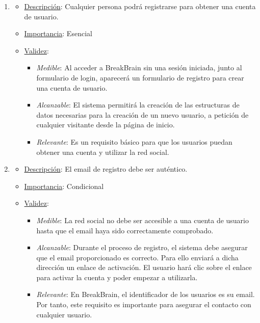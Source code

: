 \begin{enumerate}
\item %
  \begin{itemize}
  \item \underline{Descripción}: Cualquier persona podrá registrarse para obtener una cuenta de usuario.
  \item \underline{Importancia}: Esencial
  \item \underline{Validez}:
    \begin{itemize}
    \item \textit{Medible}: Al acceder a BreakBrain sin una sesión iniciada, junto al formulario de login, aparecerá un formulario de registro para crear una cuenta de usuario.
    \item \textit{Alcanzable}: El sistema permitirá la creación de las estructuras de datos necesarias para la creación de un nuevo usuario, a petición de cualquier visitante desde la página de inicio.
    \item \textit{Relevante}: Es un requisito básico para que los usuarios puedan obtener una cuenta y utilizar la red social.
    \end{itemize}
  \end{itemize}

\item %
  \begin{itemize}
  \item \underline{Descripción}: El email de registro debe ser auténtico.
  \item \underline{Importancia}: Condicional
  \item \underline{Validez}:
    \begin{itemize}
    \item \textit{Medible}: La red social no debe ser accesible a una cuenta de usuario hasta que el email haya sido correctamente comprobado.
    \item \textit{Alcanzable}: Durante el proceso de registro, el sistema debe asegurar que el email proporcionado es correcto. Para ello enviará a dicha dirección un enlace de activación. El usuario hará clic sobre el enlace para activar la cuenta y poder empezar a utilizarla.
    \item \textit{Relevante}: En BreakBrain, el identificador de los usuarios es su email. Por tanto, este requisito es importante para asegurar el contacto con cualquier usuario.
    \end{itemize}
  \end{itemize}


\end{enumerate}
